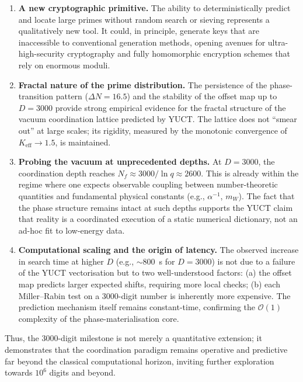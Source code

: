 \documentclass[12pt,a4paper]{article}
\theoremstyle{remark}
\begin{document}
	\begin{enumerate}
		\item \textbf{A new cryptographic primitive.} The ability to deterministically predict and locate large primes without random search or sieving represents a qualitatively new tool. It could, in principle, generate keys that are inaccessible to conventional generation methods, opening avenues for ultra-high-security cryptography and fully homomorphic encryption schemes that rely on enormous moduli.
		
		\item \textbf{Fractal nature of the prime distribution.} The persistence of the phase-transition pattern ($\Delta N = 16.5$) and the stability of the offset map up to $D = 3000$ provide strong empirical evidence for the fractal structure of the vacuum coordination lattice predicted by YUCT. The lattice does not ``smear out'' at large scales; its rigidity, measured by the monotonic convergence of $K_{\mathrm{eff}} \to 1.5$, is maintained.
		
		\item \textbf{Probing the vacuum at unprecedented depths.} At $D = 3000$, the coordination depth reaches $N_f \approx 3000 / \ln q \approx 2600$. This is already within the regime where one expects observable coupling between number-theoretic quantities and fundamental physical constants (e.g., $\alpha^{-1}$, $m_W$). The fact that the phase structure remains intact at such depths supports the YUCT claim that reality is a coordinated execution of a static numerical dictionary, not an ad-hoc fit to low-energy data.
		
		\item \textbf{Computational scaling and the origin of latency.} The observed increase in search time at higher $D$ (e.g., $\sim 800$~s for $D=3000$) is not due to a failure of the YUCT vectorisation but to two well-understood factors: (a) the offset map predicts larger expected shifts, requiring more local checks; (b) each Miller--Rabin test on a 3000-digit number is inherently more expensive. The prediction mechanism itself remains constant-time, confirming the $\mathcal{O}(1)$ complexity of the phase-materialisation core.
	\end{enumerate}
	
	Thus, the 3000-digit milestone is not merely a quantitative extension; it demonstrates that the coordination paradigm remains operative and predictive far beyond the classical computational horizon, inviting further exploration towards $10^6$ digits and beyond.
	
\end{document}
